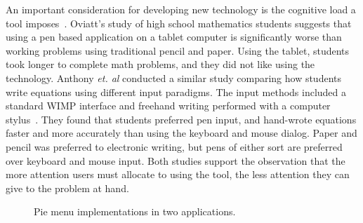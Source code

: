 An important consideration for developing new technology is the
cognitive load a tool imposes~\cite{oviatt-math-quiet}. Oviatt's study
of high school mathematics students suggests that using a pen based
application on a tablet computer is significantly worse than working
problems using traditional pencil and paper. Using the tablet,
students took longer to complete math problems, and they did not like
using the technology. Anthony \textit{et. al} conducted a similar
study comparing how students write equations using different input
paradigms. The input methods included a standard WIMP interface and
freehand writing performed with a computer
stylus~\cite{anthony-multimodal}. They found that students preferred
pen input, and hand-wrote equations faster and more accurately than
using the keyboard and mouse dialog. Paper and pencil was preferred to
electronic writing, but pens of either sort are preferred over
keyboard and mouse input. Both studies support the observation that
the more attention users must allocate to using the tool, the less
attention they can give to the problem at hand.

\begin{figure}
\begin{center}
  \caption{Pie menu implementations in two applications.}
  \label{fig:pie-menu}
\end{center}
\end{figure}

